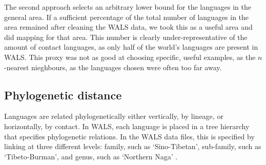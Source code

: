 \documentclass[11pt]{article}
\begin{document}
The second approach selects an arbitrary lower bound for the languages in the general area. If a sufficient percentage of the total number of languages in the area remained after cleaning the WALS data, we took this as a useful area and did mapping for that area. 
This number is clearly under-representative of the amount of contact languages, as only half of the world's languages are present in WALS. This proxy was not as good at choosing specific, useful examples, as the $n$-nearest nieghbours, as the languages chosen were often too far away. 

\subsection{Phylogenetic distance}

Languages are related phylogenetically either vertically, by lineage, or horizontally, by contact. In WALS, each language is placed in a tree hierarchy that specifies phylogenetic relations. In the WALS data files, this is specified by linking at three different levels: family, such as `Sino-Tibetan', sub-family, such as `Tibeto-Burman', and genus, such as `Northern Naga' . %
\end{document}
